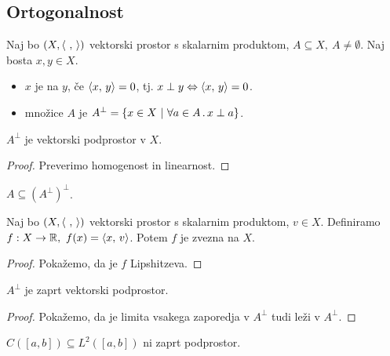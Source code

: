 \begin{zgled}
    \todo
\end{zgled}

\subsection{Ortogonalnost}
\begin{definicija}
    Naj bo \((X, \left\langle \ , \,  \right\rangle)\) vektorski prostor s skalarnim produktom, \(A \subseteq X, \ A \neq \emptyset\). Naj bosta \(x, y \in X\).
    \begin{itemize}
        \item \(x\) je  na \(y\), če \(\left\langle x, \, y \right\rangle = 0\), tj. \(x \perp y \Leftrightarrow \left\langle x, \, y \right\rangle = 0\).
        \item {} množice \(A\) je \(A^\perp = \left\{x \in X \ | \ \forall a \in A \,.\, x \perp a\right\}\).
    \end{itemize}
\end{definicija}

\begin{trditev}
    \(A^\perp\) je vektorski podprostor v \(X\).
\end{trditev}

\begin{proof}
    Preverimo homogenost in linearnost.
\end{proof}

\begin{opomba}
    \(A \subseteq (A^\perp)^\perp\).
\end{opomba}

\begin{trditev}
    Naj bo \((X, \left\langle \ , \,  \right\rangle)\) vektorski prostor s skalarnim produktom, \(v \in X\). Definiramo \(f: X \to \mathbb{R}, \ f(x) = \left\langle x, \, v \right\rangle\). Potem \(f\) je zvezna na \(X\).
\end{trditev}

\begin{proof}
    Pokažemo, da je \(f\) Lipshitzeva.
\end{proof}

\begin{posledica}
    \(A^\perp\) je zaprt vektorski podprostor.
\end{posledica}

\begin{proof}
    Pokažemo, da je limita vsakega zaporedja v \(A^\perp\) tudi leži v \(A^\perp\).
\end{proof}

\begin{opomba}
    \(C([a, b]) \subseteq L^2([a,b])\) ni zaprt podprostor.
\end{opomba}


